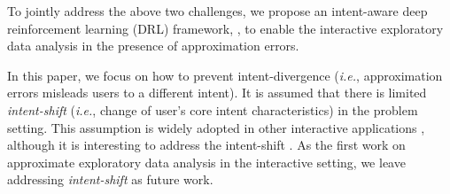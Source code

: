 To jointly address the above two challenges, we propose an intent-aware deep reinforcement learning (DRL) framework, \name, to enable the interactive exploratory data analysis in the presence of approximation errors. 

%
In this paper, we focus on how to prevent intent-divergence (\emph{i.e.}, approximation errors misleads users to a different intent). It is assumed that there is limited \textit{intent-shift} (\emph{i.e.}, change of user's core intent characteristics) in the problem setting. 
This assumption is widely adopted in other interactive applications \cite{liu2018dialogue,guo2018dialog,tan2019drill}, although it is interesting to address the intent-shift \cite{xie2021tiage,arnold2019sector}. As the first work on approximate exploratory data analysis in the interactive setting, we leave addressing \textit{intent-shift} as future work.


